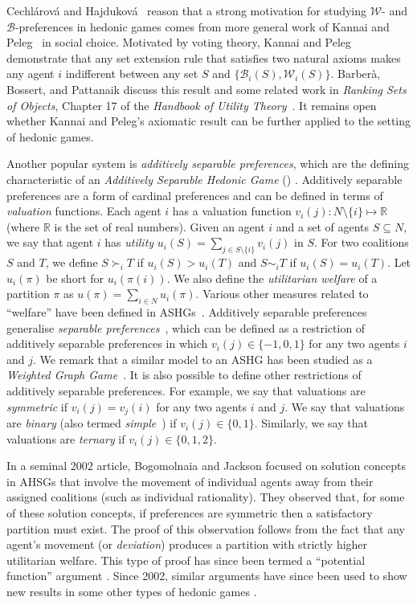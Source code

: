 Cechl\'arov\'a and Hajdukov\'a~\cite{CH02} reason that a strong motivation for studying $\mathscr{W}$- and $\mathscr{B}$-preferences in hedonic games comes from more general work of Kannai and Peleg~\cite{KANNAI1984172} in social choice. Motivated by voting theory, Kannai and Peleg demonstrate that any set extension rule that satisfies two natural axioms makes any agent $i$ indifferent between any set $S$ and $\{\mathscr{B}_i(S),\mathscr{W}_i(S) \}$. Barber\`a, Bossert, and Pattanaik discuss this result and some related work in 
\emph{Ranking Sets of Objects}, Chapter 17 of the \emph{Handbook of Utility Theory}~\cite{BBP04}. It remains open whether Kannai and Peleg's axiomatic result can be further applied to the setting of hedonic games.

Another popular system is \emph{additively separable preferences}, which are the defining characteristic of an \emph{Additively Separable Hedonic Game} () \cite{BKS01,Olsen2007}. Additively separable preferences are a form of cardinal preferences and can be defined in terms of \emph{valuation} functions. Each agent $i$ has a valuation function $v_i(j) : N \setminus \{ i \} \mapsto \mathbb{R}$ (where $\mathbb{R}$ is the set of real numbers). Given an agent $i$ and a set of agents $S\subseteq N$, we say that agent $i$ has \emph{utility} $u_i(S)=\sum_{j\in S\setminus \{ i \}} v_i(j)$ in $S$. For two coalitions $S$ and $T$, we define $S\succ_i T$ if $u_i(S) > u_i(T)$ and $S \sim_i T$ if $u_i(S) = u_i(T)$. Let $u_{i}(\pi)$ be short for $u_{i}(\pi(i))$. We also define the \emph{utilitarian welfare} of a partition $\pi$ as $u(\pi) = \sum_{i \in N} u_i(\pi)$. Various other measures related to ``welfare'' have been defined in ASHGs~\cite{AZIZ2013316}. Additively separable preferences generalise \emph{separable preferences}~\cite{Haj06}, which can be defined as a restriction of additively separable preferences in which $v_i(j)\in\{-1,0,1\}$ for any two agents $i$ and $j$. We remark that a similar model to an ASHG has been studied as a \emph{Weighted Graph Game}~\cite{Deng94}.  It is also possible to define other restrictions of additively separable preferences. For example, we say that valuations are \emph{symmetric} if $v_i(j) = v_j(i)$ for any two agents $i$ and $j$. We say that valuations are \emph{binary} (also termed \emph{simple}~\cite{ABBHOP19}) if $v_i(j) \in \{ 0, 1 \}$. Similarly, we say that valuations are \emph{ternary} if $v_i(j) \in \{ 0, 1, 2 \}$. 

In a seminal 2002 article, Bogomolnaia and Jackson \cite{BJ02} focused on solution concepts in AHSGs that involve the movement of individual agents away from their assigned coalitions (such as individual rationality). They observed that, for some of these solution concepts, if preferences are symmetric then a satisfactory partition must exist. The proof of this observation follows from the fact that any agent's movement (or \emph{deviation}) produces a partition with strictly higher utilitarian welfare. This type of proof has since been termed a ``potential function'' argument \cite{HedonicGamesHOCSC}. Since 2002, similar arguments have since been used to show new results in some other types of hedonic games \cite{BrandtBullingerWilczynski2021}.

